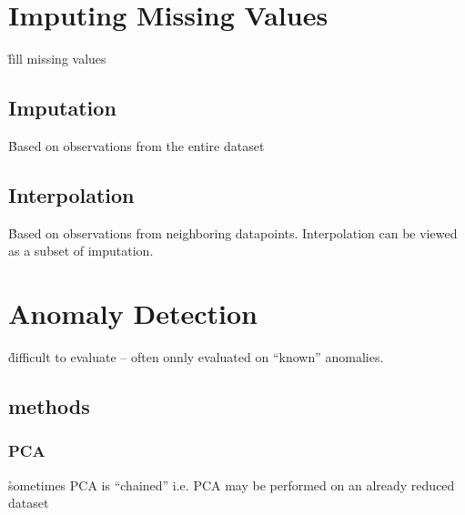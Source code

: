 


\section{Imputing Missing Values}
\label{appendix:imputing_missing_values}

\r{fill missing values}

\subsection{Imputation}

\r{Based on observations from the entire dataset}



\subsection{Interpolation}

\r{Based on observations from neighboring datapoints.  Interpolation can be viewed as a subset of imputation.}




\section{Anomaly Detection}

\r{difficult to evaluate -- often onnly evaluated on ``known'' anomalies.}

\subsection{methods}

\subsubsection{PCA}


\r{sometimes PCA is ``chained'' i.e. PCA may be performed on an already reduced dataset}

